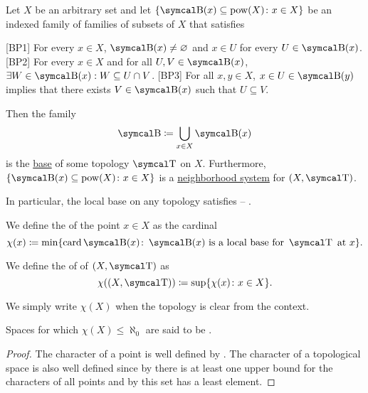 \begin{proposition}\label{thm:topological_local_base_axioms}\cite[13]{Engelking1989}
  Let \( X \) be an arbitrary set and let \( \{ \CB(x) \subseteq \Pow(X) \colon x \in X \} \) be an indexed family of families of subsets of \( X \) that satisfies
  \begin{description}
    [BP1] For every \( x \in X \), \( \CB(x) \neq \varnothing \) and \( x \in U \) for every \( U \in \CB(x) \).
    [BP2] For every \( x \in X \) and for all \( U, V \in \CB(x) \), \( \exists W \in \CB(x): W \subseteq U \cap V \).
    [BP3] For all \( x, y \in X \), \( x \in U \in \CB(y) \) implies that there exists \( V \in \CB(x) \) such that \( U \subseteq V \).
  \end{description}

  Then the family
  \begin{equation*}
    \CB \coloneqq \bigcup_{x \in X} \CB(x)
  \end{equation*}
  is the \hyperref[thm:topological_base_axioms]{base} of some topology \( \CT \) on \( X \). Furthermore, \( \{ \CB(x) \subseteq \Pow(X) \colon x \in X \} \) is a \hyperref[def:topological_local_base]{neighborhood system} for \( (X, \CT) \).

  In particular, the local base on any topology satisfies  -- .
\end{proposition}

\begin{definition}\label{def:topological_space_character}
  We define the  of the point \( x \in X \) as the cardinal
  \begin{equation*}
    \chi(x) \coloneqq \min \{ \Card \CB(x) \colon \CB(x) \text{ is a local base for } \CT \text{ at } x \}.
  \end{equation*}

  We define the  of of \( (X, \CT) \) as
  \begin{equation*}
    \chi((X, \CT)) \coloneqq \sup \{ \chi(x) \colon x \in X \}.
  \end{equation*}

  We simply write \( \chi(X) \) when the topology is clear from the context.

  Spaces for which \( \chi(X) \leq \aleph_0 \) are said to be .
\end{definition}
\begin{proof}
  The character of a point is well defined by . The character of a topological space is also well defined since by  there is at least one upper bound for the characters of all points and by  this set has a least element.
\end{proof}

